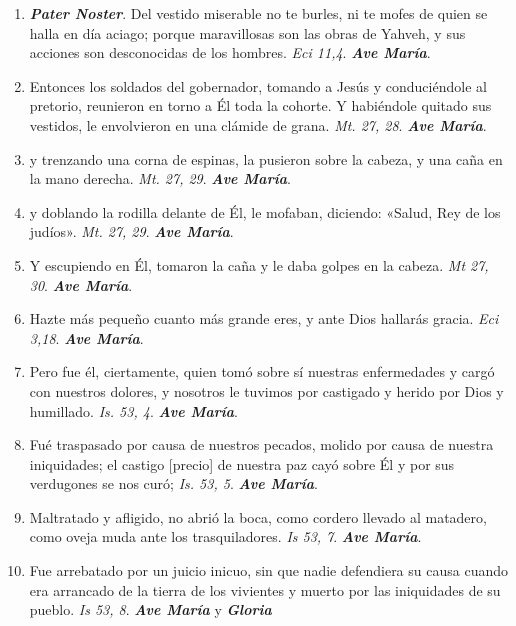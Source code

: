 \documentclass[11pt,a4paper]{book}
\begin{document}
    \begin{enumerate}
    
        \item \textbf{\emph{Pater Noster}}. Del vestido miserable no te burles, ni te mofes de quien se halla en día aciago; 
            porque maravillosas son las obras de Yahveh, y sus acciones son desconocidas de los hombres. \emph{Eci 11,4}. \textbf{\emph{Ave María}}.

        \item Entonces los soldados del gobernador, tomando a Jesús y conduciéndole al pretorio, reunieron en torno a Él toda la cohorte. 
            Y habiéndole quitado sus vestidos, le envolvieron en una clámide de grana. \emph{Mt. 27, 28}. \textbf{\emph{Ave María}}.

        \item y trenzando una corna de espinas, la pusieron sobre la cabeza, y una caña en la mano derecha. \emph{Mt. 27, 29}. \textbf{\emph{Ave María}}.

        \item y doblando la rodilla delante de Él, le mofaban, diciendo: «Salud, Rey de los judíos». \emph{Mt. 27, 29}. \textbf{\emph{Ave María}}.

        \item Y escupiendo en Él, tomaron la caña y le daba golpes en la cabeza. \emph{Mt 27, 30}. \textbf{\emph{Ave María}}.

        \item Hazte más pequeño cuanto más grande eres, y ante Dios hallarás gracia. \emph{Eci 3,18}. \textbf{\emph{Ave María}}.
        
        \item Pero fue él, ciertamente, quien tomó sobre sí nuestras enfermedades y cargó con nuestros dolores, y nosotros
            le tuvimos por castigado y herido por Dios y humillado. \emph{Is. 53, 4}. \textbf{\emph{Ave María}}.

        \item Fué traspasado por causa de nuestros pecados, molido por causa de nuestra iniquidades; 
            el castigo [precio] de nuestra paz cayó sobre Él y por sus verdugones se nos curó; \emph{Is. 53, 5}. \textbf{\emph{Ave María}}.

        \item Maltratado y afligido, no abrió la boca, como cordero llevado al matadero, como oveja muda ante los trasquiladores. \emph{Is 53, 7}. \textbf{\emph{Ave María}}.

        \item Fue arrebatado por un juicio inicuo, sin que nadie defendiera su causa cuando era arrancado de la tierra de los vivientes y muerto por las iniquidades de su pueblo.
            \emph{Is 53, 8}. \textbf{\emph{Ave María}} y \textbf{\emph{Gloria}}

    \end{enumerate}    
\end{document}
